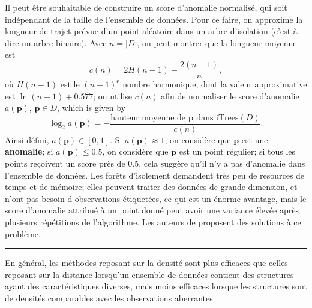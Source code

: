 \noindent Il peut être souhaitable de construire un score d'anomalie normalisé, qui soit indépendant de la taille de l'ensemble de données.
Pour ce faire, on approxime la longueur de trajet prévue d'un point aléatoire dans un arbre d'isolation (c'est-à-dire un arbre binaire). Avec $n = |D|$, on peut montrer que la longueur moyenne est 
$$
c(n) 
= 2 H(n-1) - \frac{2(n-1)}{n},
$$
o\`u $H(n-1)$ est le $(n-1)^{\text{e}}$ nombre harmonique, dont la valeur approximative est $\ln(n-1) + 0.577$;
on utilise $c(n)$ afin de normaliser le score d'anomalie $a(\mathbf{p})$, $\mathbf{p} \in D$, which is given by
$$
\log_2 a(\mathbf{p})
= -\frac{\text{hauteur moyenne de $\mathbf{p}$ dans $\text{iTrees}(D)$}}{c(n)}.
$$
Ainsi défini, $a(\mathbf{p})\in [0,1]$. Si $a(\mathbf{p}) \approx 1$, on consid\`ere que $\mathbf{p}$ est une \textbf{anomalie}; si $a(\mathbf{p}) \leq 0.5$, on consid\`ere que $\mathbf{p}$ est un point r\'egulier; si tous les points reçoivent un score pr\`es de $0.5$, cela suggère qu'il n'y a pas d'anomalie dans l'ensemble de donn\'ees.
\newl Les forêts d'isolement demandent  tr\`es peu de resources de temps et de mémoire; elles peuvent traiter des données de grande dimension, et n'ont pas besoin d observations  étiquetées, ce qui est un \'enorme avantage, mais le score d'anomalie attribué à un point donné peut avoir une variance élevée apr\`es plusieurs r\'ep\'etitions de l'algorithme. Les auteurs de \cite{EIF} proposent des solutions \`a ce problème.
\begin{center}\rule{0.5\linewidth}{.4pt}\end{center}
En général, les m\'ethodes reposant sur la densit\'e sont plus efficaces que celles reposant sur la distance lorsqu'un ensemble de données contient des structures ayant des caractéristiques diverses, mais moins efficaces lorsque les structures sont de densités comparables avec les observations aberrantes \cite{JZ}.
